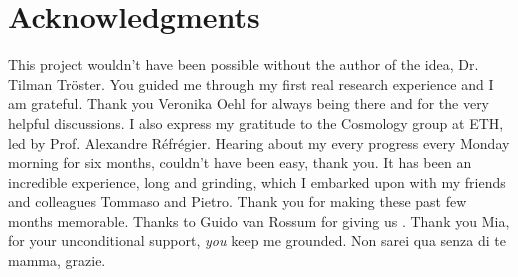 \section*{Acknowledgments}
This project wouldn't have been possible without the author of the idea, Dr. Tilman Tröster. You guided me through my first real research experience and I am grateful. Thank you Veronika Oehl for always being there and for the very helpful discussions. I also express my gratitude to the Cosmology group at ETH, led by Prof. Alexandre Réfrégier. Hearing about my every progress every Monday morning for six months, couldn't have been easy, thank you. It has been an incredible experience, long and grinding, which I embarked upon with my friends and colleagues Tommaso and Pietro. Thank you for making these past few months memorable. Thanks to Guido van Rossum for giving us . Thank you Mia, for your unconditional support, \textit{you} keep me grounded. Non sarei qua senza di te mamma, grazie.

\bigskip

\noindent
\hfill {}